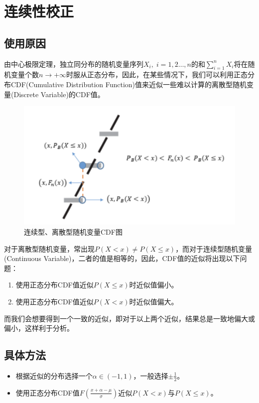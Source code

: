 \section{连续性校正}

\subsection{使用原因}
由中心极限定理，独立同分布的随机变量序列$X_i,\;i=1,2\dots,n$的和$\sum\limits_{i=1}^{n}X_i$将在随机变量个数$n\to+\infty$时服从正态分布，因此，在某些情况下，我们可以利用正态分布CDF(Cumulative Distribution Function)值来近似一些难以计算的离散型随机变量(Discrete Variable)的CDF值。

\begin{figure}[htbp] 
	\centering 
	\includegraphics{probability-theory/asymptotic/CDF-of-c-and-d-variables.png} 
	\caption{连续型、离散型随机变量CDF图} 
\end{figure}

\hspace{2em}对于离散型随机变量，常出现$P(X<x)\ne P(X\leqslant x)$，而对于连续型随机变量(Continuous Variable)，二者的值是相等的，因此，CDF值的近似将出现以下问题：
\begin{enumerate}
	\item 使用正态分布CDF值近似$P(X\leqslant x)$时近似值偏小。
	\item 使用正态分布CDF值近似$P(X< x)$时近似值偏大。
\end{enumerate}
\hspace{2em}而我们会想要得到一个一致的近似，即对于以上两个近似，结果总是一致地偏大或偏小，这样利于分析。

\subsection{具体方法}
\begin{itemize}
	\item 根据近似的分布选择一个$\alpha\in (-1,1)$，一般选择$\pm\frac{1}{2}$。
	\item 使用正态分布CDF值$F(\frac{x+\alpha-\mu}{\sigma})$近似$P(X< x)$与$P(X\leqslant x)$。
\end{itemize}